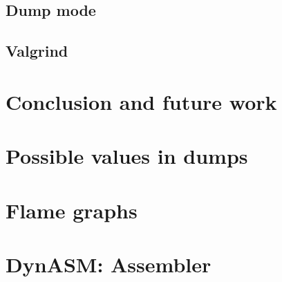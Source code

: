 \documentclass[12pt, oneside]{Thesis}
\begin{document}
    \section{Dump mode}
    \label{Sec:Dump-mode}
    

    \section{Valgrind}
    \label{Sec:Valgrind}
    

\chapter{Conclusion and future work}


\clearpage
{}
\appendix
\baselineskip=16pt

\chapter{Possible values in dumps}
\label{Apendix:dump-values}


\chapter{Flame graphs}
\label{Apendix:fl}


\chapter{DynASM: Assembler}
\label{Apendix:DynASM}



\backmatter


\label{Bibliography}

\renewcommand{\bibname}{References}


\end{document}
